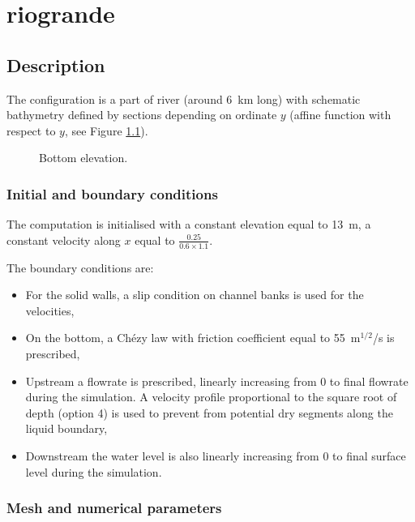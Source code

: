 \chapter{riogrande}

\section{Description}


The configuration is a part of river (around 6~km long) with schematic bathymetry
defined by sections depending on ordinate $y$
(affine function with respect to $y$, see Figure \ref{t2d:riogrande:bottom}).

\begin{figure}[H]
 \centering
\caption{Bottom elevation.}
\label{t2d:riogrande:bottom}
\end{figure}

\subsection{Initial and boundary conditions}

The computation is initialised with a constant elevation equal to 13~m,
a constant velocity along $x$ equal to $\frac{0.25}{0.6\times1.1}$.

The boundary conditions are:
\begin{itemize}
\item For the solid walls, a slip condition on channel banks is used for the
velocities,
\item On the bottom, a Chézy law with friction coefficient equal to
55~m$^{1/2}$/s is prescribed,
\item Upstream a flowrate is prescribed,
linearly increasing from 0 to final flowrate during the simulation.
A velocity profile proportional to the square root of depth (option 4)
is used to prevent from potential dry segments along the liquid boundary,
\item Downstream the water level is also linearly increasing from 0 to final
surface level during the simulation.
\end{itemize}

\subsection{Mesh and numerical parameters}

